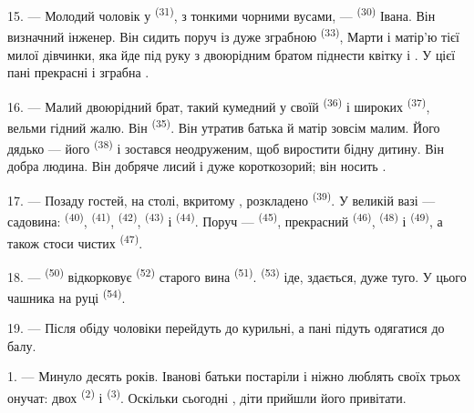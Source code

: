 15. --- Молодий чоловік у  \textsuperscript{(31)}, з тонкими
чорними вусами, ---  \textsuperscript{(30)} Івана. Він визначний
інженер. Він сидить поруч із дуже зграбною 
\textsuperscript{(33)},  Марти і матір'ю тієї милої
дівчинки, яка йде під руку з двоюрідним братом піднести квітку і
 . У цієї пані прекрасні
 і зграбна .

16. --- Малий двоюрідний брат, такий кумедний у своїй 
\textsuperscript{(36)} і широких  \textsuperscript{(37)}, вельми
гідний жалю. Він  \textsuperscript{(35)}. Він утратив батька й
матір зовсім малим. Його дядько --- його 
\textsuperscript{(38)} і зостався неодруженим, щоб виростити бідну дитину. Він
добра людина. Він добряче лисий і дуже короткозорий; він носить
.

\VUsaut{2.4mm}
\VUsaut{3.0mm}

17. --- Позаду гостей, на столі, вкритому , розкладено
 \textsuperscript{(39)}. У великій вазі --- садовина:
 \textsuperscript{(40)},  \textsuperscript{(41)},
 \textsuperscript{(42)},  \textsuperscript{(43)}
і  \textsuperscript{(44)}. Поруч --- 
\textsuperscript{(45)}, прекрасний  \textsuperscript{(46)},
 \textsuperscript{(48)} і 
\textsuperscript{(49)}, а також стоси чистих 
\textsuperscript{(47)}.

18. ---  \textsuperscript{(50)} відкорковує 
\textsuperscript{(52)} старого вина  \textsuperscript{(51)}.
 \textsuperscript{(53)} іде, здається, дуже туго. У цього чашника
на руці  \textsuperscript{(54)}.

19. --- Після обіду чоловіки перейдуть до курильні, а пані підуть одягатися до
балу.

\VUsaut{5.0mm}
\VUsaut{1.6mm}
\VUsaut{2.6mm}

\VUsaut{3.0mm}

1. --- Минуло десять років. Іванові батьки постаріли і ніжно люблять своїх
трьох онучат: двох  \textsuperscript{(2)} і 
\textsuperscript{(3)}. Оскільки сьогодні , діти прийшли
його привітати.

